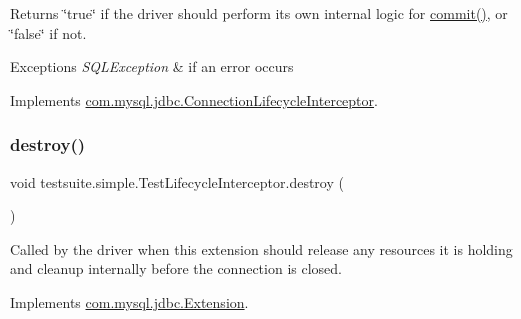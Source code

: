 \begin{DoxyReturn}{Returns}
\char`\"{}true\char`\"{} if the driver should perform its own internal logic for \mbox{\hyperlink{classtestsuite_1_1simple_1_1_test_lifecycle_interceptor_a1c51358948a855403a8953f3d4ba5590}{commit()}}, or \char`\"{}false\char`\"{} if not.
\end{DoxyReturn}

\begin{DoxyExceptions}{Exceptions}
{\em S\+Q\+L\+Exception} & if an error occurs \\
\hline
\end{DoxyExceptions}


Implements \mbox{\hyperlink{interfacecom_1_1mysql_1_1jdbc_1_1_connection_lifecycle_interceptor_ac8f559b2bf353ede24b6845d5edeeeb0}{com.\+mysql.\+jdbc.\+Connection\+Lifecycle\+Interceptor}}.

\mbox{\label{classtestsuite_1_1simple_1_1_test_lifecycle_interceptor_a2a1a99507005bb6d901d3782880aac09}} 
\subsubsection{\texorpdfstring{destroy()}{destroy()}}
{\footnotesize\ttfamily void testsuite.\+simple.\+Test\+Lifecycle\+Interceptor.\+destroy (\begin{DoxyParamCaption}{ }\end{DoxyParamCaption})}

Called by the driver when this extension should release any resources it is holding and cleanup internally before the connection is closed. 

Implements \mbox{\hyperlink{interfacecom_1_1mysql_1_1jdbc_1_1_extension_a7d9644de305efed5df71f3fcc7cc1772}{com.\+mysql.\+jdbc.\+Extension}}.

\mbox{\label{classtestsuite_1_1simple_1_1_test_lifecycle_interceptor_ad1b9b390383950835ad6b7550c27589e}} 
